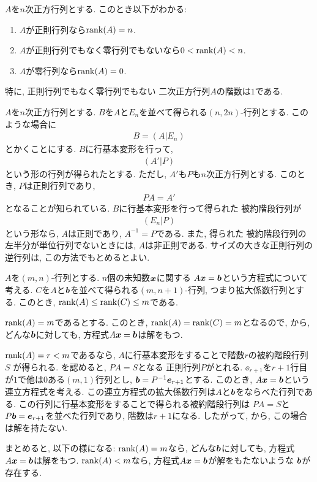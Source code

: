 \begin{remark}
  $A$を$n$次正方行列とする.
  このとき以下がわかる:
  \begin{enumerate}
  \item $A$が正則行列なら$\operatorname{rank}(A)=n$.
  \item $A$が正則行列でもなく零行列でもないなら$0<\operatorname{rank}(A)<n$.
  \item $A$が零行列なら$\operatorname{rank}(A)=0$.
  \end{enumerate}
  特に,
  正則行列でもなく零行列でもない
  二次正方行列$A$の階数は$1$である.
\end{remark}

\begin{remark}
  \label{thm:fund:inverse}
  \Provelater
  $A$を$n$次正方行列とする.
  $B$を$A$と$E_n$を並べて得られる$(n,2n)$-行列とする.
  このような場合に
  \begin{align*}
    B=(A|E_n)
  \end{align*}
  とかくことにする.
  $B$に行基本変形を行って,
  \begin{align*}
    (A'|P)
  \end{align*}
  という形の行列が得られたとする.
  ただし, $A'$も$P$も$n$次正方行列とする.
  このとき,
  $P$は正則行列であり,
  \begin{align*}
    PA=A'
  \end{align*}
  となることが知られている.
  $B$に行基本変形を行って得られた
  被約階段行列が
  \begin{align*}
    (E_n|P)
  \end{align*}
  という形なら,
  $A$は正則であり,
  $A^{-1}=P$である.
  また, 得られた
  被約階段行列の左半分が単位行列でないときには,
  $A$は非正則である.
  サイズの大きな正則行列の逆行列は,
  この方法でもとめるとよい.
\end{remark}

\begin{remark}
  \label{rem:syslineq:rank:gen}
  $A$を$(m,n)$-行列とする.
  $n$個の未知数$\boldsymbol{x}$に関する
  $A\boldsymbol{x}=\boldsymbol{b}$という方程式について考える.
  $C$を$A$と$\boldsymbol{b}$を並べて得られる$(m,n+1)$-行列,
  つまり拡大係数行列とする.
  このとき, $\operatorname{rank}(A)\leq \operatorname{rank}(C)\leq m$である.

  $\operatorname{rank}(A)=m$であるとする.
  このとき,
  $\operatorname{rank}(A)=\operatorname{rank}(C)=m$となるので,  
  から,
  どんな$\boldsymbol{b}$に対しても, 
  方程式$A\boldsymbol{x}=\boldsymbol{b}$は解をもつ.

  $\operatorname{rank}(A)=r<m$であるなら,
  $A$に行基本変形をすることで階数$r$の被約階段行列$S$
  が得られる.
  を認めると,
  $PA=S$となる
  正則行列$P$がとれる.
  $\ee_{r+1}$を$r+1$行目が$1$で他は$0$ある$(m,1)$行列とし,
  $\boldsymbol{b}=P^{-1}\boldsymbol{e}_{r+1}$とする.
  このとき,
  $A\boldsymbol{x}=\boldsymbol{b}$という連立方程式を考える.
  この連立方程式の拡大係数行列は$A$と$\boldsymbol{b}$をならべた行列である.
  この行列に行基本変形をすることで得られる被約階段行列は
  $PA=S$と
  $P\boldsymbol{b}=\boldsymbol{e}_{r+1}$を並べた行列であり,
  階数は$r+1$になる.  したがって,
  から,
  この場合は解を持たない.

  まとめると, 以下の様になる:
$\operatorname{rank}(A)=m$なら,
  どんな$\boldsymbol{b}$に対しても, 
  方程式$A\boldsymbol{x}=\boldsymbol{b}$は解をもつ.
$\operatorname{rank}(A)<m$なら,
  方程式$A\boldsymbol{x}=\boldsymbol{b}$が解をもたないような
  $\boldsymbol{b}$が存在する.
  
  
\end{remark}

